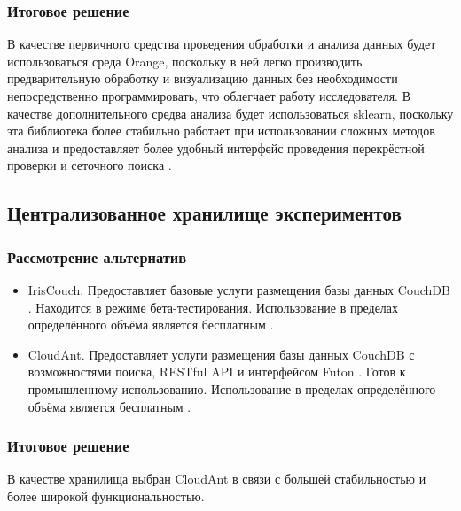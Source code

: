\subsubsection{Итоговое решение}

В качестве первичного средства проведения обработки и анализа данных будет использоваться среда Orange, поскольку в ней легко производить предварительную обработку и визуализацию данных без необходимости непосредственно программировать, что облегчает работу исследователя.
В качестве дополнительного средва анализа будет использоваться sklearn, поскольку эта библиотека более стабильно работает при использовании сложных методов анализа и предоставляет более удобный интерфейс проведения перекрёстной проверки \cite{cross-validation} и сеточного поиска \cite{grid-search}.

\subsection{Централизованное хранилище экспериментов}

\subsubsection{Рассмотрение альтернатив}

\begin{itemize}

\item IrisCouch. Предоставляет базовые услуги размещения базы данных CouchDB \cite{couchdb}. Находится в режиме бета-тестирования. Использование в пределах определённого объёма является бесплатным \cite{iriscouch}.
\item CloudAnt. Предоставляет услуги размещения базы данных CouchDB \cite{couchdb} с возможностями поиска, RESTful API \cite{restful-api} и интерфейсом Futon \cite{futon}. Готов к промышленному использованию. Использование в пределах определённого объёма является бесплатным \cite{cloudant}.

\end{itemize}

\subsubsection{Итоговое решение}

В качестве хранилища выбран CloudAnt в связи с большей стабильностью и более широкой функциональностью.